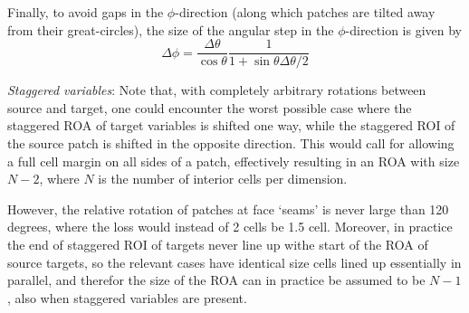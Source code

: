 \documentclass[paper=a4,fontsize=11pt]{scrartcl}
\numberwithin{equation}{section}		%
\numberwithin{figure}{section}			%
\numberwithin{table}{section}				%
\begin{document}
\noindent Finally, to avoid gaps in the $\phi$-direction (along which patches are tilted away from their great-circles), the size of the angular step in the $\phi$-direction is given by
\begin{equation}
    \Delta\phi = \frac{\Delta\theta}{\cos\theta} \frac{1}{1 + \sin\theta\Delta\theta/2 }
\end{equation}

\textit{Staggered variables}: Note that, with completely arbitrary rotations between source and target, one could encounter the worst possible case where the staggered ROA of target variables is shifted one way, while the staggered ROI of the source patch is shifted in the opposite direction.  This would call for allowing a full cell margin on all sides of a patch, effectively resulting in an ROA with size $N-2$, where $N$ is the number of interior cells per dimension.

However, the relative rotation of patches at face `seams' is never large than 120 degrees, where the loss would instead of 2 cells be 1.5 cell.  Moreover, in practice the end of staggered ROI of targets never line up withe start of the ROA of source targets, so the relevant cases have identical size cells lined up essentially in parallel, and therefor the size of the ROA can in practice be assumed to be $N-1$, also when staggered variables are present.

\end{document}
